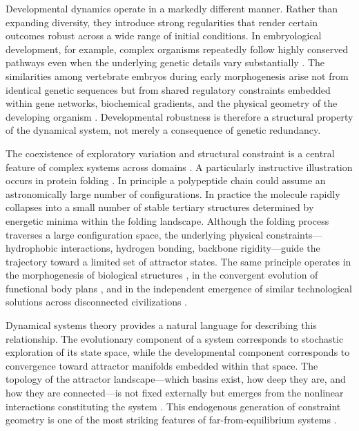 \documentclass[12pt]{article}
\begin{document}
Developmental dynamics operate in a markedly different manner. Rather than expanding diversity, they introduce strong regularities that render certain outcomes robust across a wide range of initial conditions. In embryological development, for example, complex organisms repeatedly follow highly conserved pathways even when the underlying genetic details vary substantially \cite{goodwin1994,thompson1917}. The similarities among vertebrate embryos during early morphogenesis arise not from identical genetic sequences but from shared regulatory constraints embedded within gene networks, biochemical gradients, and the physical geometry of the developing organism \cite{kauffman1993,thompson1917}. Developmental robustness is therefore a structural property of the dynamical system, not merely a consequence of genetic redundancy.

The coexistence of exploratory variation and structural constraint is a central feature of complex systems across domains \cite{anderson1972,gellmann1994}. A particularly instructive illustration occurs in protein folding \cite{kauffman1993}. In principle a polypeptide chain could assume an astronomically large number of configurations. In practice the molecule rapidly collapses into a small number of stable tertiary structures determined by energetic minima within the folding landscape. Although the folding process traverses a large configuration space, the underlying physical constraints---hydrophobic interactions, hydrogen bonding, backbone rigidity---guide the trajectory toward a limited set of attractor states. The same principle operates in the morphogenesis of biological structures \cite{thompson1917,goodwin1994}, in the convergent evolution of functional body plans \cite{kauffman1993}, and in the independent emergence of similar technological solutions across disconnected civilizations \cite{smart2009}.

Dynamical systems theory \cite{strogatz1994} provides a natural language for describing this relationship. The evolutionary component of a system corresponds to stochastic exploration of its state space, while the developmental component corresponds to convergence toward attractor manifolds embedded within that space. The topology of the attractor landscape---which basins exist, how deep they are, and how they are connected---is not fixed externally but emerges from the nonlinear interactions constituting the system \cite{strogatz1994,nicolis1977}. This endogenous generation of constraint geometry is one of the most striking features of far-from-equilibrium systems \cite{prigogine1984}.
\end{document}
